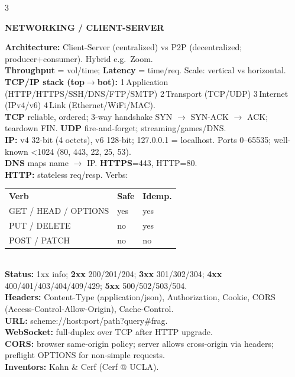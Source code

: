 \documentclass[10pt,letterpaper]{article}
\newenvironment{topic}[1]{%
  \par\addvspace{1.5pt}%
  \noindent\colorbox{hdrBG}{%
    \begin{minipage}{\dimexpr\linewidth-2\fboxsep\relax}%
      \centering\bfseries\sffamily\fontsize{6pt}{7pt}\selectfont\color{hdrFG}\MakeUppercase{#1}%
    \end{minipage}%
  }\par\nobreak\vskip0.5pt%
  \begingroup\setlength{\leftskip}{0pt}\setlength{\rightskip}{0pt}%
}{%
  \endgroup\par\addvspace{0.5pt}%
}
\newcommand{\hd}[1]{\textcolor{accent}{\textbf{#1}}}
\newcommand{\cn}[1]{{\ttfamily\small #1}}
\begin{document}
\begin{multicols*}{3}
\begin{topic}{Networking / Client-Server}
\hd{Architecture:} Client-Server (centralized) vs P2P (decentralized; producer+consumer). Hybrid e.g.\ Zoom.\\
\hd{Throughput} = vol/time; \hd{Latency} = time/req. Scale: vertical vs horizontal.\\
\hd{TCP/IP stack (top$\to$bot):} 1\,Application (HTTP/HTTPS/SSH/DNS/FTP/SMTP) 2\,Transport (TCP/UDP) 3\,Internet (IPv4/v6) 4\,Link (Ethernet/WiFi/MAC).\\
\hd{TCP} reliable, ordered; 3-way handshake SYN $\to$ SYN-ACK $\to$ ACK; teardown FIN. \hd{UDP} fire-and-forget; streaming/games/DNS.\\
\hd{IP:} v4 32-bit (4 octets), v6 128-bit; \cn{127.0.0.1} = localhost. Ports 0--65535; well-known <1024 (80, 443, 22, 25, 53).\\
\hd{DNS} maps name $\to$ IP. \hd{HTTPS}=443, HTTP=80.\\
\hd{HTTP:} stateless req/resp. Verbs:\\
\begin{tabular}{@{}lll@{}}
\textbf{Verb} & \textbf{Safe} & \textbf{Idemp.} \\
GET / HEAD / OPTIONS & yes & yes\\
PUT / DELETE & no & yes\\
POST / PATCH & no & no\\
\end{tabular}\\
\hd{Status:} 1xx info; \textbf{2xx} 200/201/204; \textbf{3xx} 301/302/304; \textbf{4xx} 400/401/403/404/409/429; \textbf{5xx} 500/502/503/504.\\
\hd{Headers:} Content-Type (application/json), Authorization, Cookie, CORS (Access-Control-Allow-Origin), Cache-Control.\\
\hd{URL:} \cn{scheme://host:port/path?query\#frag}.\\
\hd{WebSocket:} full-duplex over TCP after HTTP upgrade.\\
\hd{CORS:} browser same-origin policy; server allows cross-origin via headers; preflight OPTIONS for non-simple requests.\\
\hd{Inventors:} Kahn \& Cerf (Cerf @ UCLA).
\end{topic}


\end{multicols*}
\end{document}
